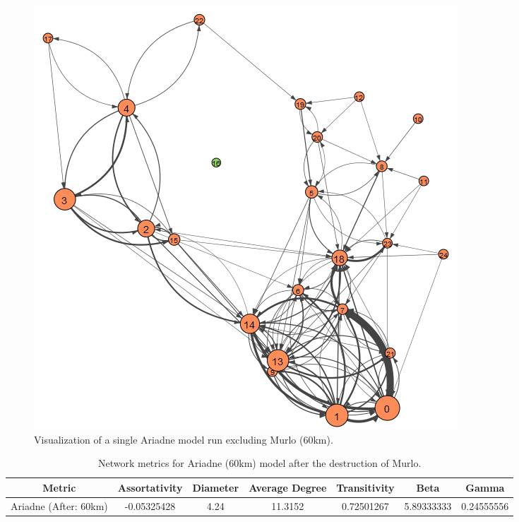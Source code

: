 \documentclass[12pt,a4paper]{thesis}
\begin{document}
\begin{figure}[H]
\centering
\includegraphics[width=0.9\linewidth]{./AfterViz/ariadne60}
\caption{Visualization of a single Ariadne model run excluding Murlo (60km).}
\label{fig:ariadneA60}
\end{figure}

\begin{table}[H]
\centering
\caption{Network metrics for Ariadne (60km) model after the destruction of Murlo.}
\tiny
\begin{tabular}{|c|c|c|c|c|c|c|}
\hline Metric & Assortativity & Diameter & Average Degree & Transitivity & Beta & Gamma \\ 
\hline Ariadne (After: 60km) & -0.05325428	& 4.24 & 11.3152	& 0.72501267 & 5.89333333 & 0.24555556 \\ 
\hline 
\end{tabular} 
\label{tab:ariadneNetAfter60}
\end{table}
\end{document}
